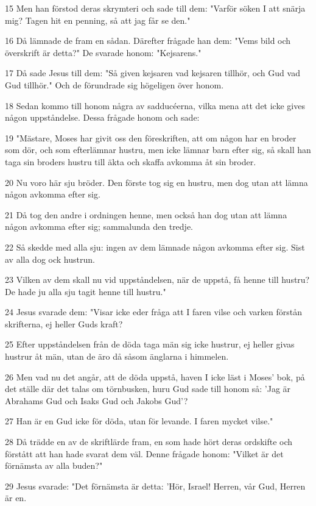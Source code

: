 \par 15 Men han förstod deras skrymteri och sade till dem: "Varför söken I att snärja mig? Tagen hit en penning, så att jag får se den."
\par 16 Då lämnade de fram en sådan. Därefter frågade han dem: "Vems bild och överskrift är detta?" De svarade honom: "Kejsarens."
\par 17 Då sade Jesus till dem: "Så given kejsaren vad kejsaren tillhör, och Gud vad Gud tillhör." Och de förundrade sig högeligen över honom.
\par 18 Sedan kommo till honom några av sadducéerna, vilka mena att det icke gives någon uppståndelse. Dessa frågade honom och sade:
\par 19 "Mästare, Moses har givit oss den föreskriften, att om någon har en broder som dör, och som efterlämnar hustru, men icke lämnar barn efter sig, så skall han taga sin broders hustru till äkta och skaffa avkomma åt sin broder.
\par 20 Nu voro här sju bröder. Den förste tog sig en hustru, men dog utan att lämna någon avkomma efter sig.
\par 21 Då tog den andre i ordningen henne, men också han dog utan att lämna någon avkomma efter sig; sammalunda den tredje.
\par 22 Så skedde med alla sju: ingen av dem lämnade någon avkomma efter sig. Sist av alla dog ock hustrun.
\par 23 Vilken av dem skall nu vid uppståndelsen, när de uppstå, få henne till hustru? De hade ju alla sju tagit henne till hustru."
\par 24 Jesus svarade dem: "Visar icke eder fråga att I faren vilse och varken förstån skrifterna, ej heller Guds kraft?
\par 25 Efter uppståndelsen från de döda taga män sig icke hustrur, ej heller givas hustrur åt män, utan de äro då såsom änglarna i himmelen.
\par 26 Men vad nu det angår, att de döda uppstå, haven I icke läst i Moses' bok, på det ställe där det talas om törnbusken, huru Gud sade till honom så: 'Jag är Abrahams Gud och Isaks Gud och Jakobs Gud'?
\par 27 Han är en Gud icke för döda, utan för levande. I faren mycket vilse."
\par 28 Då trädde en av de skriftlärde fram, en som hade hört deras ordskifte och förstått att han hade svarat dem väl. Denne frågade honom: "Vilket är det förnämsta av alla buden?"
\par 29 Jesus svarade: "Det förnämsta är detta: 'Hör, Israel! Herren, vår Gud, Herren är en.
